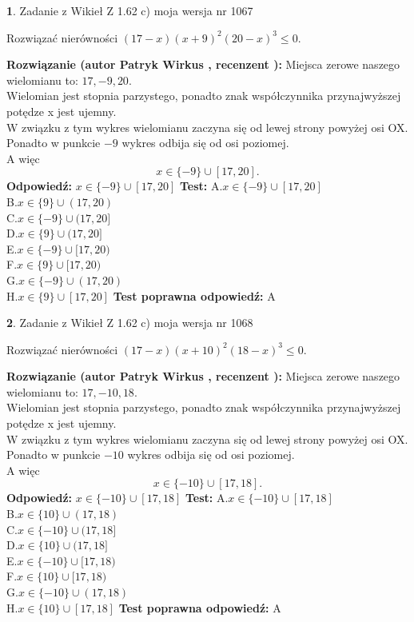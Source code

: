 \documentclass[12pt, a4paper]{article}
\theoremstyle{definition} %
\newtheorem{zad}{}
\newcommand{\zadStart}[1]{\begin{zad}#1\newline}
\newcommand{\zadStop}{\end{zad}}
\newcommand{\rozwStart}[2]{\noindent \textbf{Rozwiązanie (autor #1 , recenzent #2): }\newline}
\newcommand{\rozwStop}{\newline}
\newcommand{\odpStart}{\noindent \textbf{Odpowiedź:}\newline}
\newcommand{\odpStop}{\newline}
\newcommand{\testStart}{\noindent \textbf{Test:}\newline}
\newcommand{\testStop}{\newline}
\newcommand{\kluczStart}{\noindent \textbf{Test poprawna odpowiedź:}\newline}
\newcommand{\kluczStop}{\newline}
\begin{document}
\zadStart{Zadanie z Wikieł Z 1.62 c) moja wersja nr 1067}

Rozwiązać nierówności $(17-x)(x+9)^{2}(20-x)^{3}\le0$.
\zadStop
\rozwStart{Patryk Wirkus}{}
Miejsca zerowe naszego wielomianu to: $17, -9, 20$.\\
Wielomian jest stopnia parzystego, ponadto znak współczynnika przy\linebreak najwyższej potędze x jest ujemny.\\ W związku z tym wykres wielomianu zaczyna się od lewej strony powyżej osi OX.\\
Ponadto w punkcie $-9$ wykres odbija się od osi poziomej.\\
A więc $$x \in \{-9\} \cup [17,20].$$
\rozwStop
\odpStart
$x \in \{-9\} \cup [17,20]$
\odpStop
\testStart
A.$x \in \{-9\} \cup [17,20]$\\
B.$x \in \{9\} \cup (17,20)$\\
C.$x \in \{-9\} \cup (17,20]$\\
D.$x \in \{9\} \cup (17,20]$\\
E.$x \in \{-9\} \cup [17,20)$\\
F.$x \in \{9\} \cup [17,20)$\\
G.$x \in \{-9\} \cup (17,20)$\\
H.$x \in \{9\} \cup [17,20]$
\testStop
\kluczStart
A
\kluczStop



\zadStart{Zadanie z Wikieł Z 1.62 c) moja wersja nr 1068}

Rozwiązać nierówności $(17-x)(x+10)^{2}(18-x)^{3}\le0$.
\zadStop
\rozwStart{Patryk Wirkus}{}
Miejsca zerowe naszego wielomianu to: $17, -10, 18$.\\
Wielomian jest stopnia parzystego, ponadto znak współczynnika przy\linebreak najwyższej potędze x jest ujemny.\\ W związku z tym wykres wielomianu zaczyna się od lewej strony powyżej osi OX.\\
Ponadto w punkcie $-10$ wykres odbija się od osi poziomej.\\
A więc $$x \in \{-10\} \cup [17,18].$$
\rozwStop
\odpStart
$x \in \{-10\} \cup [17,18]$
\odpStop
\testStart
A.$x \in \{-10\} \cup [17,18]$\\
B.$x \in \{10\} \cup (17,18)$\\
C.$x \in \{-10\} \cup (17,18]$\\
D.$x \in \{10\} \cup (17,18]$\\
E.$x \in \{-10\} \cup [17,18)$\\
F.$x \in \{10\} \cup [17,18)$\\
G.$x \in \{-10\} \cup (17,18)$\\
H.$x \in \{10\} \cup [17,18]$
\testStop
\kluczStart
A
\kluczStop
\end{document}
